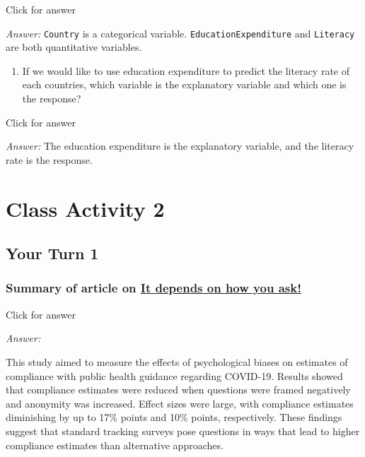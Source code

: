 \documentclass[
]{book}
\providecommand{\tightlist}{%
  \setlength{\itemsep}{0pt}\setlength{\parskip}{0pt}}
\begin{document}
Click for answer

\emph{Answer:} \texttt{Country} is a categorical variable. \texttt{EducationExpenditure} and \texttt{Literacy} are both quantitative variables.

\begin{enumerate}
\def\labelenumi{\alph{enumi}.}
\setcounter{enumi}{4}
\tightlist
\item
  If we would like to use education expenditure to predict the literacy rate of each countries, which variable is the explanatory variable and which one is the response?
\end{enumerate}

Click for answer

\emph{Answer:} The education expenditure is the explanatory variable, and the literacy rate is the response.

\hypertarget{class-activity-2}{%
\chapter{Class Activity 2}\label{class-activity-2}}

\hypertarget{your-turn-1-1}{%
\section{Your Turn 1}\label{your-turn-1-1}}

\hypertarget{summary-of-article-on-it-depends-on-how-you-ask}{%
\subsection{\texorpdfstring{Summary of article on \href{https://jech.bmj.com/content/75/4/387.abstract}{It depends on how you ask!}}{Summary of article on It depends on how you ask!}}\label{summary-of-article-on-it-depends-on-how-you-ask}}

Click for answer

\emph{Answer:}

This study aimed to measure the effects of psychological biases on estimates of compliance with public health guidance regarding COVID-19. Results showed that compliance estimates were reduced when questions were framed negatively and anonymity was increased. Effect sizes were large, with compliance estimates diminishing by up to 17\% points and 10\% points, respectively. These findings suggest that standard tracking surveys pose questions in ways that lead to higher compliance estimates than alternative approaches.
\end{document}
